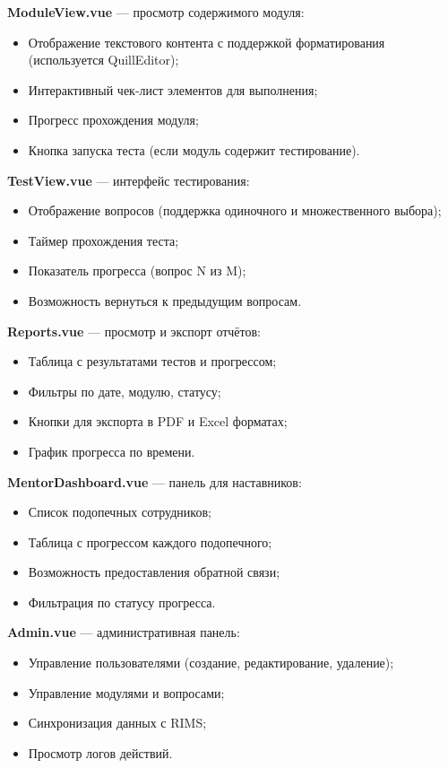 \textbf{ModuleView.vue} --- просмотр содержимого модуля:
\begin{itemize}
    \item Отображение текстового контента с поддержкой форматирования (используется QuillEditor);
    \item Интерактивный чек-лист элементов для выполнения;
    \item Прогресс прохождения модуля;
    \item Кнопка запуска теста (если модуль содержит тестирование).
\end{itemize}

\textbf{TestView.vue} --- интерфейс тестирования:
\begin{itemize}
    \item Отображение вопросов (поддержка одиночного и множественного выбора);
    \item Таймер прохождения теста;
    \item Показатель прогресса (вопрос N из M);
    \item Возможность вернуться к предыдущим вопросам.
\end{itemize}

\textbf{Reports.vue} --- просмотр и экспорт отчётов:
\begin{itemize}
    \item Таблица с результатами тестов и прогрессом;
    \item Фильтры по дате, модулю, статусу;
    \item Кнопки для экспорта в PDF и Excel форматах;
    \item График прогресса по времени.
\end{itemize}

\textbf{MentorDashboard.vue} --- панель для наставников:
\begin{itemize}
    \item Список подопечных сотрудников;
    \item Таблица с прогрессом каждого подопечного;
    \item Возможность предоставления обратной связи;
    \item Фильтрация по статусу прогресса.
\end{itemize}

\textbf{Admin.vue} --- административная панель:
\begin{itemize}
    \item Управление пользователями (создание, редактирование, удаление);
    \item Управление модулями и вопросами;
    \item Синхронизация данных с RIMS;
    \item Просмотр логов действий.
\end{itemize}

